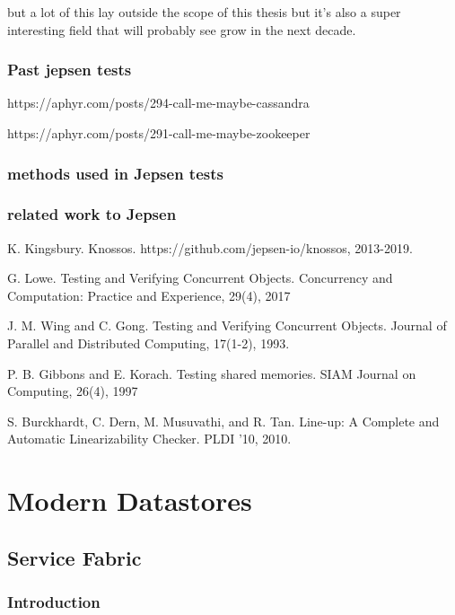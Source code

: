 \documentclass[a4paper,10pt,titlepage]{report}
\begin{document}
but a lot of this lay outside the scope of this thesis but it's also a super interesting field that will probably see grow in the next decade.





\subsection{Past jepsen tests}

https://aphyr.com/posts/294-call-me-maybe-cassandra


https://aphyr.com/posts/291-call-me-maybe-zookeeper







\subsection{methods used in Jepsen tests}

\subsection{related work to Jepsen}


K. Kingsbury. Knossos.
https://github.com/jepsen-io/knossos, 2013-2019.

G. Lowe. Testing and Verifying Concurrent Objects.
Concurrency and Computation: Practice and
Experience, 29(4), 2017

J. M. Wing and C. Gong. Testing and Verifying
Concurrent Objects. Journal of Parallel and
Distributed Computing, 17(1-2), 1993.

P. B. Gibbons and E. Korach. Testing shared
memories. SIAM Journal on Computing, 26(4), 1997

S. Burckhardt, C. Dern, M. Musuvathi, and R. Tan.
Line-up: A Complete and Automatic Linearizability
Checker. PLDI ’10, 2010.



\chapter{Modern Datastores}


\section{Service Fabric}

\subsection{Introduction}
\end{document}
